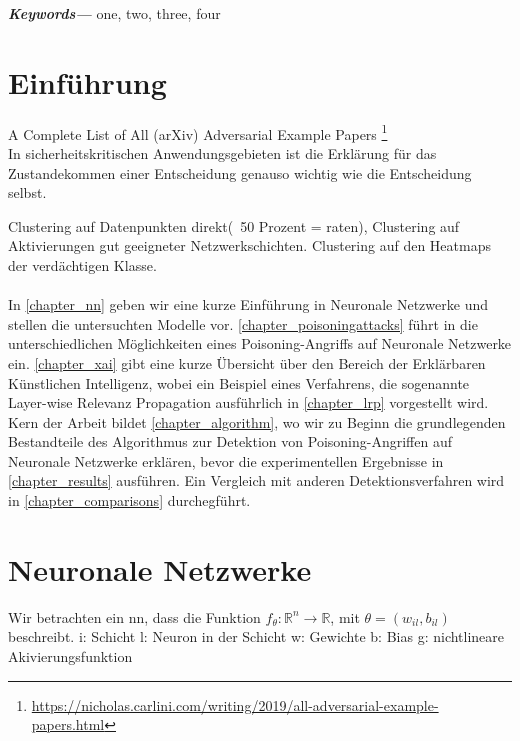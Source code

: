 \documentclass[twoside, 12pt,a4paper]{article}
\providecommand{\keywords}[1]
{
	\small	
	\textbf{\textit{Keywords---}} #1
}
\numberwithin{equation}{section}
\begin{document}
	\keywords{one, two, three, four}
	\newpage
	\listoffigures
	
	\listoftables
	
	\lstlistoflistings
	
	\newpage
	\tableofcontents
	\newpage
	

	
	
	
	\section{Einführung}
	
	A Complete List of All (arXiv) Adversarial Example Papers \footnote{\url{https://nicholas.carlini.com/writing/2019/all-adversarial-example-papers.html}}
	\\
	In sicherheitskritischen Anwendungsgebieten ist die Erklärung für das Zustandekommen einer Entscheidung genauso wichtig wie die Entscheidung selbst\cite{LRP_DNN}.
	
	Clustering auf Datenpunkten direkt(~50 Prozent = raten), Clustering auf Aktivierungen gut geeigneter Netzwerkschichten. Clustering auf den Heatmaps der verdächtigen Klasse.\\
	\\
	In \autoref{chapter_nn} geben wir eine kurze Einführung in Neuronale Netzwerke und stellen die untersuchten Modelle vor. \autoref{chapter_poisoningattacks} führt in die unterschiedlichen Möglichkeiten eines Poisoning-Angriffs auf Neuronale Netzwerke ein. \autoref{chapter_xai} gibt eine kurze Übersicht über den Bereich der Erklärbaren Künstlichen Intelligenz, wobei ein Beispiel eines Verfahrens, die sogenannte Layer-wise Relevanz Propagation ausführlich in \autoref{chapter_lrp} vorgestellt wird. Kern der Arbeit bildet \autoref{chapter_algorithm}, wo wir zu Beginn die grundlegenden Bestandteile des Algorithmus zur Detektion von Poisoning-Angriffen auf Neuronale Netzwerke erklären, bevor die experimentellen Ergebnisse in \autoref{chapter_results} ausführen. Ein Vergleich mit anderen Detektionsverfahren wird in \autoref{chapter_comparisons} durchegführt.
	\section{Neuronale Netzwerke} \label{chapter_nn}
	Wir betrachten ein \gls{nn}, dass die Funktion $f_{\theta}:\mathbb{R}^n \to\mathbb{R}$, mit $\theta = (w_{il}, b_{il})$ beschreibt. 
	i: Schicht
	l: Neuron in der Schicht
	w: Gewichte 
	b: Bias
	g: nichtlineare Akivierungsfunktion
	
\end{document}
